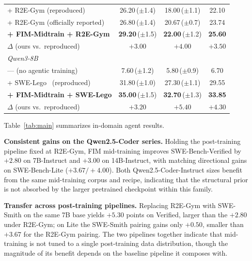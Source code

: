 \begin{table}[t]
\begin{tabular}{lccc}
\quad + R2E-Gym (reproduced)                          & 26.20\,($\pm$1.4)          & 18.00\,($\pm$1.1)          & 22.10 \\
\quad + R2E-Gym (officially reported)                 & 26.80\,($\pm$1.4)          & 20.67\,($\pm$0.7)          & 23.74 \\
\quad \textbf{+ FIM-Midtrain + R2E-Gym}               & \textbf{29.20}\,($\pm$1.5) & \textbf{22.00}\,($\pm$1.2) & \textbf{25.60} \\
\rowcolor{blue!8}
\quad\quad $\Delta$ (ours vs.\ reproduced)            & $+3.00$                    & $+4.00$                    & $+3.50$ \\
\midrule
\multicolumn{4}{l}{\textit{Qwen3-8B}} \\
\quad --- (no agentic training)                       & 7.60\,($\pm$1.2)           & 5.80\,($\pm$0.9)           & 6.70 \\
\quad + SWE-Lego~\citep{swelego} (reproduced)         & 31.80\,($\pm$1.0)          & 27.30\,($\pm$1.1)          & 29.55 \\
\quad \textbf{+ FIM-Midtrain + SWE-Lego}              & \textbf{35.00}\,($\pm$1.5) & \textbf{32.70}\,($\pm$1.3) & \textbf{33.85} \\
\rowcolor{blue!8}
\quad\quad $\Delta$ (ours vs.\ reproduced)            & $+3.20$                    & $+5.40$                    & $+4.30$ \\
\bottomrule
\end{tabular}
\end{table}

Table~\ref{tab:main} summarizes in-domain agent results.

\textbf{Consistent gains on the Qwen2.5-Coder series.}
Holding the post-training pipeline fixed at R2E-Gym, FIM mid-training
improves SWE-Bench-Verified by $+2.80$ on 7B-Instruct and $+3.00$ on
14B-Instruct, with matching directional gains on SWE-Bench-Lite
($+3.67/+4.00$). Both Qwen2.5-Coder-Instruct sizes benefit from the same
mid-training corpus and recipe, indicating that the structural prior is
not absorbed by the larger pretrained checkpoint within this family.

\textbf{Transfer across post-training pipelines.}
Replacing R2E-Gym with SWE-Smith on the same 7B base yields $+5.30$
points on Verified, larger than the $+2.80$ under R2E-Gym; on Lite the
SWE-Smith pairing gains only $+0.50$, smaller than $+3.67$ for the
R2E-Gym pairing. The two pipelines together indicate that mid-training
is not tuned to a single post-training data distribution, though the
magnitude of its benefit depends on the baseline pipeline it composes
with.

